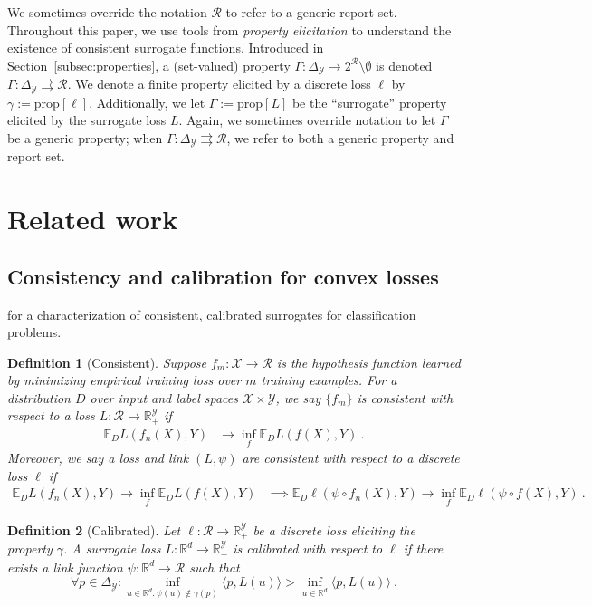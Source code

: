 \documentclass{article}
\newcommand{\reals}{\mathbb{R}}
\newcommand{\simplex}{\Delta_\Y}
\newcommand{\prop}[1]{\mathrm{prop}[#1]}
\newcommand{\E}{\mathbb{E}}
\newcommand{\R}{\mathcal{R}}
\newcommand{\X}{\mathcal{X}}
\newcommand{\Y}{\mathcal{Y}}
\newcommand{\inprod}[2]{\langle #1, #2 \rangle}
\newcommand{\toto}{\rightrightarrows}
\newtheorem{definition}{Definition}
\begin{document}
We sometimes override the notation $\R$ to refer to a generic report set.
Throughout this paper, we use tools from \emph{property elicitation} to understand the existence of consistent surrogate functions.
Introduced in Section~\ref{subsec:properties}, a (set-valued) property $\Gamma: \simplex \to 2^\R \setminus \emptyset$ is denoted $\Gamma:\simplex \toto \R$.
We denote a finite property elicited by a discrete loss $\ell$ by $\gamma := \prop{\ell}$.
Additionally, we let $\Gamma := \prop{L}$ be the ``surrogate'' property elicited by the surrogate loss $L$.
Again, we sometimes override notation to let $\Gamma$ be a generic property; when $\Gamma: \simplex \toto \R$, we refer to both a generic property and report set.

\section{Related work}\label{sec:related-work}
\subsection{Consistency and calibration for convex losses}\label{subsec:convex-surrogates}
\cite{bartlett2006convexity,tewari2007consistency} for a characterization of consistent, calibrated surrogates for classification problems.

\begin{definition}[Consistent]
	Suppose $f_m : \X \to \R$ is the hypothesis function learned by minimizing empirical training loss over $m$ training examples.
	For a distribution $D$ over input and label spaces $\X \times\Y$, we say $\{f_m\}$ is \emph{consistent} with respect to a loss $L: \R \to \reals^\Y_+$ if
	\begin{align*}
	\E_D L(f_n(X), Y) &\to \inf_f \E_D L(f(X), Y)~.~
	\end{align*}
	Moreover, we say a loss and link $(L,\psi)$ are consistent with respect to a discrete loss $\ell$ if 
	\begin{align*}
		\E_D L(f_n(X), Y) \to \inf_f \E_D L(f(X), Y) &\implies \E_D \ell(\psi \circ f_n(X), Y) \to \inf_f \E_D \ell(\psi \circ f(X), Y)~.~
	\end{align*}
\end{definition}

\begin{definition}[Calibrated]
	Let $\ell : \R \to \reals^\Y_+$ be a discrete loss eliciting the property $\gamma$.
	A surrogate loss $L : \reals^d \to \reals^\Y_+$ is \emph{calibrated} with respect to $\ell$ if there exists a link function $\psi: \reals^d \to \R$ such that
	\begin{equation}
	\forall p \in \simplex: \inf_{u \in \reals^d : \psi(u) \not \in \gamma(p)} \inprod{p}{L(u)} > \inf_{u \in \reals^d} \inprod{p}{L(u)}~.~
	\end{equation}
\end{definition}
\end{document}
